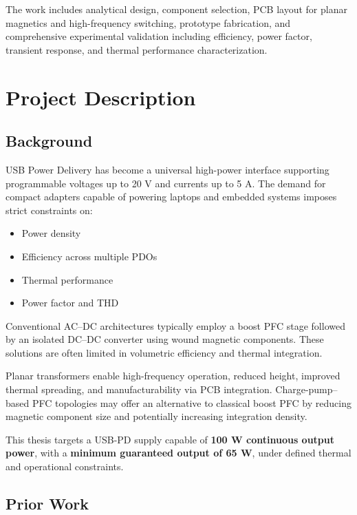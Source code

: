 \documentclass[12pt,a4paper]{report}
\begin{document}
The work includes analytical design, component selection, PCB layout for planar magnetics and high-frequency switching, prototype fabrication, and comprehensive experimental validation including efficiency, power factor, transient response, and thermal performance characterization.

\tableofcontents
\clearpage

\chapter{Project Description}

\section{Background}

USB Power Delivery has become a universal high-power interface supporting programmable voltages up to 20 V and currents up to 5 A. The demand for compact adapters capable of powering laptops and embedded systems imposes strict constraints on:

\begin{itemize}
    \item Power density
    \item Efficiency across multiple PDOs
    \item Thermal performance
    \item Power factor and THD
\end{itemize}

Conventional AC--DC architectures typically employ a boost PFC stage followed by an isolated DC--DC converter using wound magnetic components. These solutions are often limited in volumetric efficiency and thermal integration.

Planar transformers enable high-frequency operation, reduced height, improved thermal spreading, and manufacturability via PCB integration. Charge-pump--based PFC topologies may offer an alternative to classical boost PFC by reducing magnetic component size and potentially increasing integration density.

This thesis targets a USB-PD supply capable of \textbf{100 W continuous output power}, with a \textbf{minimum guaranteed output of 65 W}, under defined thermal and operational constraints.

\section{Prior Work}
\end{document}
